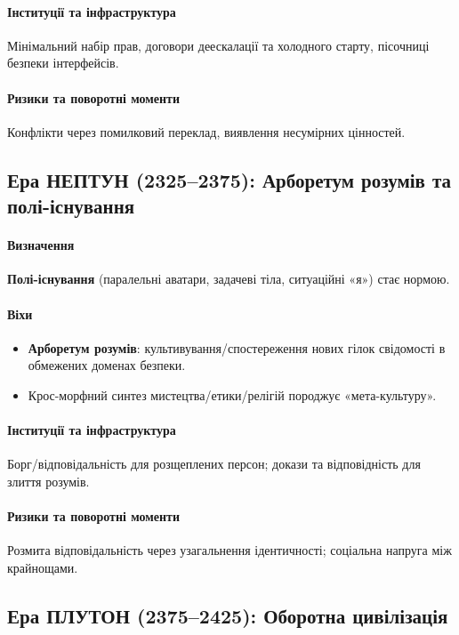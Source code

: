 \documentclass[11pt]{article}
\begin{document}
\paragraph{Інституції та інфраструктура} Мінімальний набір прав, договори деескалації та холодного старту, пісочниці безпеки інтерфейсів.

\paragraph{Ризики та поворотні моменти} Конфлікти через помилковий переклад, виявлення несумірних цінностей.

\subsection{Ера НЕПТУН (2325–2375): Арборетум розумів та полі-існування}
\paragraph{Визначення} \textbf{Полі-існування} (паралельні аватари, задачеві тіла, ситуаційні «я») стає нормою.

\paragraph{Віхи}
\begin{itemize}[noitemsep]
  \item \textbf{Арборетум розумів}: культивування/спостереження нових гілок свідомості в обмежених доменах безпеки.
  \item Крос-морфний синтез мистецтва/етики/релігій породжує «мета-культуру».
\end{itemize}

\paragraph{Інституції та інфраструктура} Борг/відповідальність для розщеплених персон; докази та відповідність для злиття розумів.

\paragraph{Ризики та поворотні моменти} Розмита відповідальність через узагальнення ідентичності; соціальна напруга між крайнощами.

\subsection{Ера ПЛУТОН (2375–2425): Оборотна цивілізація}
\end{document}
